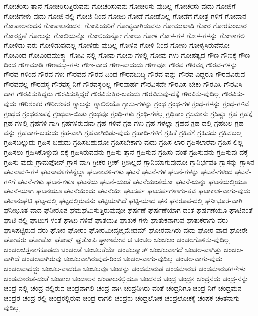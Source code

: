 {ಗೋಚರಿಸು-ತ್ತಾನೆ
ಗೋಚರಿಸುತ್ತಿರುವನು
ಗೋಚರಿಸುವನು
ಗೋಚರಿಸು-ವುದಿಲ್ಲ
ಗೋಚರಿಸು-ವುದು
ಗೋಜಿಗೆ
ಗೋಜಿಗೇಳು-ವುದು
ಗೋಜಿ-ನಲ್ಲಿ
ಗೋಜಿ-ನಿಂದ
ಗೋಜು
ಗೋಡೆ
ಗೋಡೆಎಲ್ಲ
ಗೋಡೆಗೆ
ಗೋತ್ರ-ಗಳಿಗೆ
ಗೋದಾನ
ಗೋಪಾಲನಂದನ
ಗೋಪಾಲನಂದನಃ
ಗೋಪಿಯರಿಗೆ
ಗೋಪ್ಯವಾಗಿಡುವನು
ಗೋಮುಖಾದಿ
ಗೋರ
ಗೋರಕುಂಬಾರ
ಗೋರಕ್ಷಣೆ
ಗೋಲನ್ನು
ಗೋಲಿಯನ್ನೊ
ಗೋಲಿಯನ್ನೋ
ಗೋಲು
ಗೋಳ
ಗೋಳ-ಗಳ
ಗೋಳ-ಗಳನ್ನು
ಗೋಳಾಗಲಿ
ಗೋಳಿಡು-ವರು
ಗೋಳಿಡುವುದಲ್ಲ
ಗೋಳಿಡು-ವುದಿಲ್ಲ
ಗೋಳಿನ
ಗೋಳಿ-ನಿಂದ
ಗೋಳು
ಗೋಳೈಸಿರುವೆನೋ
ಗೋವಿಂದ
ಗೋವಿಂದಮುಕ್ತ್ವಾ
ಗೋವಿ-ನಲ್ಲಿ
ಗೋವು
ಗೋವು-ಗಳಲ್ಲಿ
ಗೋವು-ಗಳು
ಗೋಹತ್ಯದ
ಗೌಣ
ಗೌಣಕ್ಕೆ
ಗೌಣ-ದಿಂದ
ಗೌಣಮಾಡಿ
ಗೌಣವಸ್ತು-ಗಳು
ಗೌಣ-ವಾದ
ಗೌಣ-ವಾದುದು
ಗೌಣವೋ
ಗೌರವ
ಗೌರವಕ್ಕೆ
ಗೌರವ-ಗಳನ್ನು
ಗೌರವ-ಗಳಿಂದ
ಗೌರವ-ಗಳು
ಗೌರವದ
ಗೌರವ-ದಿಂದ
ಗೌರವಬುದ್ಧಿ
ಗೌರವ-ವನ್ನು
ಗೌರವ-ವಿದ್ದರೂ
ಗೌರವವಿರುವ
ಗೌರವವೆಲ್ಲ
ಗೌರವಸ್ಥ
ಗೌರವಸ್ಥ-ನಿಗೆ
ಗೌರವಸ್ಥರಿಲ್ಲ
ಗೌರವಾರ್ಹ
ಗೌರವಿಸದೇ
ಗೌರವಿಸ-ಬೇಕು
ಗೌರವಿಸಿ
ಗೌರವಿಸಿ-ದಾಗ
ಗೌರವಿಸುತ್ತಿದ್ದರು
ಗೌರವಿಸುತ್ತಿದ್ದರೆ
ಗೌರವಿಸುತ್ತಿರ-ಬಹುದು
ಗೌರವಿಸುವು-ದಕ್ಕೆ
ಗೌರವಿಸು-ವುದಿಲ್ಲ
ಗೌರವಿಸು-ವುದು
ಗೌರಿಶಂಕರ
ಗೌರೀಶಂಕರ
ಗ್ಯಾಲನ್ನು
ಗ್ಯಾಲಿಲಿಯೊ
ಗ್ಯಾಸು-ಗಳನ್ನು
ಗ್ರಂಥ
ಗ್ರಂಥ-ಗಳ
ಗ್ರಂಥ-ಗಳನ್ನು
ಗ್ರಂಥ-ಗಳಿವೆ
ಗ್ರಂಥದ
ಗ್ರಂಥರೂಪಕ್ಕೆ
ಗ್ರಂಥವಾ-ಯಿತು
ಗ್ರಂಥವೂ
ಗ್ರಂಥಿ-ಗಳು
ಗ್ರಂಥಿ-ಗಳೆಲ್ಲ
ಗ್ರಥಿತಾಂ
ಗ್ರಸಮಾನಃ
ಗ್ರಸಿಷ್ಣು
ಗ್ರಹ
ಗ್ರಹಕ್ಕೆ
ಗ್ರಹ-ಗಳಲ್ಲಿ
ಗ್ರಹಗಳಿ-ಗಾಗಿ
ಗ್ರಹಗಳಿರುವುವು
ಗ್ರಹ-ಗಳಿವೆ
ಗ್ರಹ-ಗಳು
ಗ್ರಹ-ಗಳೆಲ್ಲಾ
ಗ್ರಹದ
ಗ್ರಹ-ದಲ್ಲಿ
ಗ್ರಹಬಲ
ಗ್ರಹ-ವನ್ನು
ಗ್ರಹವಾಗ-ಬಹುದು
ಗ್ರಹ-ವಾಗಿ
ಗ್ರಹವಾಗಿಬಿಡು-ವುದು
ಗ್ರಹಾದಿ-ಗಳಿಗೆ
ಗ್ರಹಿಕೆ
ಗ್ರಹಿಕೆಗೆ
ಗ್ರಹಿಸದು
ಗ್ರಹಿಸಬಲ್ಲ
ಗ್ರಹಿಸಬಲ್ಲುದು
ಗ್ರಹಿಸ-ಬಹುದು
ಗ್ರಹಿಸಬಹುದೋ
ಗ್ರಹಿಸಬೇಕಾಗು-ವುದು
ಗ್ರಹಿಸ-ಲಾರ
ಗ್ರಹಿಸಲಾರೆವು
ಗ್ರಹಿಸ-ಲಿಲ್ಲ
ಗ್ರಹಿಸಲು
ಗ್ರಹಿಸಿಕೊಳ್ಳುವು-ದಕ್ಕೆ
ಗ್ರಹಿಸಿರುವವನು
ಗ್ರಹಿಸು-ತ್ತಾನೆ
ಗ್ರಹಿಸುವ
ಗ್ರಹಿಸು-ವಂತೆ
ಗ್ರಹಿಸುವನು
ಗ್ರಹಿಸುವು-ದಕ್ಕೆ
ಗ್ರಹಿಸು-ವುದು
ಗ್ರಾಮಫೋನ್
ಗ್ರಾಸ-ವಾಗಿ
ಗ್ರೀಕರ
ಗ್ರೀಕ್
ಗ್ರೀಸಿಲ್ಲದೆ
ಗ್ಲಾನಿಯಾಗುವುದೋ
ಗ್ಲಾನಿರ್ಭವತಿ
ಗ್ಲಾಸನ್ನು
ಗ್ಲಾಸಿನ
ಘಟನಾವಳಿ-ಗಳ
ಘಟನಾವಳಿಗಳನ್ನೆಲ್ಲಾ
ಘಟನಾವಳಿ-ಗಳು
ಘಟನೆ
ಘಟನೆ-ಗಳ
ಘಟನೆ-ಗಳನ್ನು
ಘಟನೆ-ಗಳಿಂದ
ಘಟನೆ-ಗಳಿಗೆ
ಘಟನೆ-ಗಳು
ಘಟನೆ-ಗಳೂ
ಘಟನೆಯ
ಘಟನೆ-ಯಂತೆ
ಘಟನೆಯಂತೆಯೋ
ಘಟನೆ-ಯನ್ನು
ಘಟನೆಯಲ್ಲಿಯೂ
ಘಟನೆ-ಯಾಗಿ
ಘಟನೆಯೂ
ಘಟನೆಯೆಂದು
ಘಟನೆಯೇ
ಘಟಸರ್ಪ
ಘಟಸರ್ಪಗಳಾಗು-ತ್ತವೆ
ಘಟಾಕಾಶ-ವಾಗು-ವುದು
ಘಟಾನುಘಟಿ
ಘಟ್ಟ-ದಲ್ಲಿ
ಘಟ್ಟದಲ್ಲಿರುವನು
ಘಟ್ಟಿಯಾಗಿದೆ
ಘಟ್ಟಿ-ಯಾದ
ಘನ
ಘನರೂಪ-ದಲ್ಲಿ
ಘನೀಭೂತ-ವಾಗಿ
ಘನೀಭೂತ-ವಾದ
ಘನೀರೂಪ
ಘಮಘಮಿಸುತ್ತಿರುವುವೋ
ಘರ್ಷಣೆ
ಘರ್ಷಣೆಯಾಗ-ದಂತೆ
ಘರ್ಷಣೆಯೂ
ಘಾಟಿನಂತೆ
ಘಾಟಿ-ನಲ್ಲಿ
ಘಾಟುಗ-ಳಂತೆ
ಘಾಟು-ಗಳಿವೆ
ಘಾತಯತಿ
ಘಾತುಕ-ಗಳು
ಘಾತುಕನಾಗುವ
ಘಾತುಕರಾಗು-ವರು
ಘಾಸಿಪಟ್ಟಿರುವ-ವರು
ಘೋರ
ಘೋರಂ
ಘೋರಮೀದೃಙ್ಮಮೇದಮ್
ಘೋರವಾಗಿರು-ವುದು
ಘೋರ-ವಾದ
ಘೋರೇ
ಘೋಷರು
ಘೋಷೋ
ಘೋಷ್
ಘ್ನತೋಪಿ
ಘ್ರಾಣಮೇವ
ಚ
ಚಂಚಲ
ಚಂಚಲಂ
ಚಂಚಲಗೊಳಿಸು-ವುದಿಲ್ಲ
ಚಂಚಲಚಿತ್ತನಾಗಕೂಡದು
ಚಂಚಲತೆ
ಚಂಚಲತೆಯೇ
ಚಂಚಲತ್ವಾತ್
ಚಂಚಲವಾಗದೆ
ಚಂಚಲ-ವಾಗಿತ್ತು
ಚಂಚಲ-ವಾಗಿದೆ
ಚಂಚಲವಾಗಿರುವು
ಚಂಚಲವಾಗಿರುವುದ-ರಿಂದ
ಚಂಚಲ-ವಾಗು-ವುದಿಲ್ಲ
ಚಂಚಲ-ವಾಗು-ವುದು
ಚಂಚಲವಾದದ್ದು
ಚಂಚಲ-ವಾದರೂ
ಚಂಚಲವೂ
ಚಂಡನ್ನು
ಚಂಡಮಾರುಡ
ಚಂಡಮಾರುತ
ಚಂಡಮಾರುತಗಳೇಳು
ಚಂಡಮಾರುತ-ದಂತೆ
ಚಂಡಾಲ
ಚಂಡಾಲನ
ಚಂಡಾಲನಲ್ಲಿಯೂ
ಚಂದನದ
ಚಂದ್ರ
ಚಂದ್ರನ
ಚಂದ್ರನದು
ಚಂದ್ರ-ನನ್ನು
ಚಂದ್ರ-ನಲ್ಲಿ
ಚಂದ್ರ-ನಲ್ಲಿರುವ
ಚಂದ್ರನಾಗಲಿ
ಚಂದ್ರ-ನಾಗಿ
ಚಂದ್ರನಿಗಿರು-ವಂತೆ
ಚಂದ್ರನಿಗೂ
ಚಂದ್ರ-ನಿಗೆ
ಚಂದ್ರಮನ
ಚಂದ್ರರ
ಚಂದ್ರ-ರಲ್ಲಿ
ಚಂದ್ರರಲ್ಲಿರುವ
ಚಂದ್ರ-ರಾಗಲಿ
ಚಂದ್ರರು
ಚಂದ್ರಲೋಕ
ಚಂದ್ರಲೋಕಕ್ಕೆ
ಚಂಪಕ
ಚಕಿತನಾಗು-ವುದಿಲ್ಲ
}
